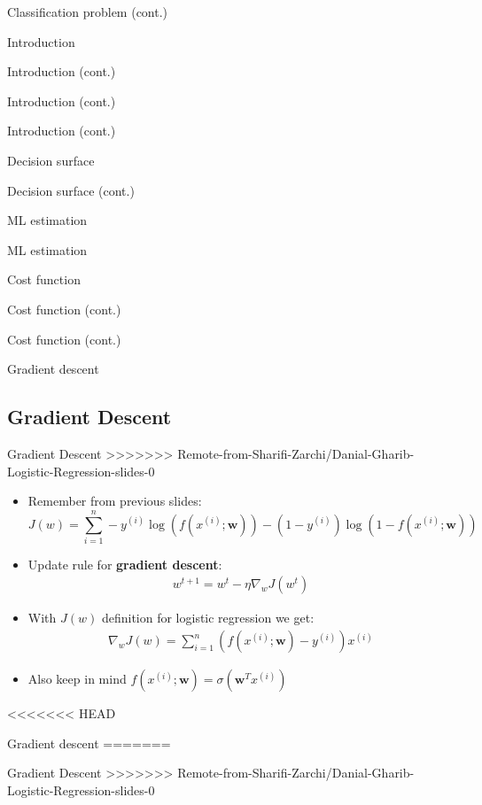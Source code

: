 \documentclass[serif, aspectratio=169]{beamer}
\begin{document}
\begin{frame}{Classification problem (cont.)}
\begin{itemize}
\begin{frame}{Introduction}
\begin{itemize}
\begin{frame}{Introduction (cont.)}
\begin{frame}{Introduction (cont.)}
\begin{frame}{Introduction (cont.)}
\begin{frame}{Decision surface}
\begin{itemize}
\begin{frame}{Decision surface (cont.)}
\begin{frame}{ML estimation}
\begin{frame}{ML estimation}
\begin{itemize}
\begin{frame}{Cost function}
\begin{frame}{Cost function (cont.)}
\begin{itemize}
\begin{itemize}
\begin{frame}{Cost function (cont.)}
\begin{frame}{Gradient descent}
\subsection{Gradient Descent}
\begin{frame}{Gradient Descent}
>>>>>>> Remote-from-Sharifi-Zarchi/Danial-Gharib-Logistic-Regression-slides-0
    \begin{itemize}
    \item Remember from previous slides:
        \[
        J(w) = \sum_{i=1}^{n}-y^{(i)}\log (f(x^{(i)}; \mathbf{w})) - 
            (1-y^{(i)})\log (1 - f(x^{(i)}; \mathbf{w}))
        \]
    \item Update rule for \textbf{gradient descent}: 
        \begin{align*}
            w^{t+1} = w^t - \eta \nabla _w J(w^t)
        \end{align*}
    \item With $J(w)$ definition for logistic regression we get:
        \begin{align*}
            \nabla _w J(w) = \sum_{i=1}^{n} (f(x^{(i)}; \mathbf{w}) - y^{(i)})x^{(i)} 
        \end{align*}
    \item Also keep in mind $f(x^{(i)}; \mathbf{w})= \sigma (\mathbf{w}^Tx^{(i)})$
        
    \end{itemize}
\end{frame}
<<<<<<< HEAD
\begin{frame}{Gradient descent}
=======
\begin{frame}{Gradient Descent}
>>>>>>> Remote-from-Sharifi-Zarchi/Danial-Gharib-Logistic-Regression-slides-0
    \begin{itemize}
    

\end{itemize}
\end{frame}
\end{frame}
\end{frame}
\end{frame}
\end{itemize}
\end{itemize}
\end{frame}
\end{frame}
\end{itemize}
\end{frame}
\end{frame}
\end{frame}
\end{itemize}
\end{frame}
\end{frame}
\end{frame}
\end{frame}
\end{itemize}
\end{frame}
\end{itemize}
\end{frame}
\end{document}
